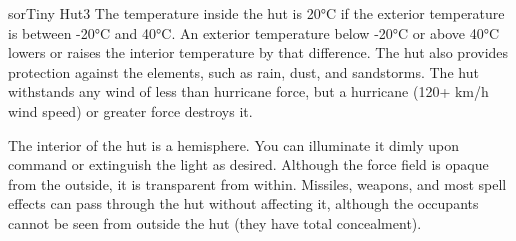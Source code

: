 \begin{spellcard}{sor}{Tiny Hut}{3}
  The temperature inside the hut is 20°C if the exterior temperature is between -20°C and 40°C.
  An exterior temperature below -20°C or above 40°C lowers or raises the interior temperature by that difference.
  The hut also provides protection against the elements, such as rain, dust, and sandstorms.
  The hut withstands any wind of less than hurricane force,
  but a hurricane (120+ km/h wind speed) or greater force destroys it.

  The interior of the hut is a hemisphere.
  You can illuminate it dimly upon command or extinguish the light as desired.
  Although the force field is opaque from the outside, it is transparent from within.
  Missiles, weapons, and most spell effects can pass through the hut without affecting it,
  although the occupants cannot be seen from outside the hut (they have total concealment).

\end{spellcard}
